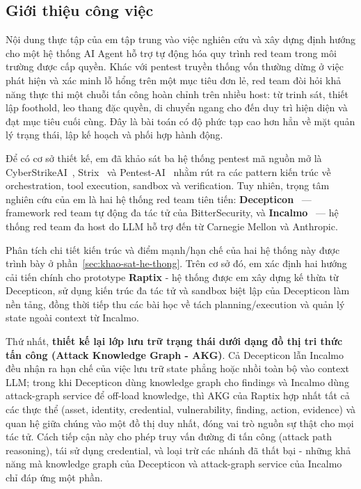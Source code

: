 \subsection{Giới thiệu công việc}
\label{sec:gioi-thieu-cong-viec}

Nội dung thực tập của em tập trung vào việc nghiên cứu và xây dựng định hướng cho một hệ thống AI Agent hỗ trợ tự động hóa quy trình red team trong môi trường được cấp quyền. Khác với pentest truyền thống vốn thường dừng ở việc phát hiện và xác minh lỗ hổng trên một mục tiêu đơn lẻ, red team đòi hỏi khả năng thực thi một chuỗi tấn công hoàn chỉnh trên nhiều host: từ trinh sát, thiết lập foothold, leo thang đặc quyền, di chuyển ngang cho đến duy trì hiện diện và đạt mục tiêu cuối cùng. Đây là bài toán có độ phức tạp cao hơn hẳn về mặt quản lý trạng thái, lập kế hoạch và phối hợp hành động.

Để có cơ sở thiết kế, em đã khảo sát ba hệ thống pentest mã nguồn mở là CyberStrikeAI~\cite{cyberstrike}, Strix~\cite{strix} và Pentest-AI~\cite{pentestai} nhằm rút ra các pattern kiến trúc về orchestration, tool execution, sandbox và verification. Tuy nhiên, trọng tâm nghiên cứu của em là hai hệ thống red team tiên tiến: \textbf{Decepticon}~\cite{decepticon} --- framework red team tự động đa tác tử của BitterSecurity, và \textbf{Incalmo}~\cite{incalmo} --- hệ thống red team đa host do LLM hỗ trợ đến từ Carnegie Mellon và Anthropic.

Phân tích chi tiết kiến trúc và điểm mạnh/hạn chế của hai hệ thống này được trình bày ở phần~\ref{sec:khao-sat-he-thong}. Trên cơ sở đó, em xác định hai hướng cải tiến chính cho prototype \textbf{Raptix} - hệ thống được em xây dựng kế thừa từ Decepticon, sử dụng kiến trúc đa tác tử và sandbox biệt lập của Decepticon làm nền tảng, đồng thời tiếp thu các bài học về tách planning/execution và quản lý state ngoài context từ Incalmo.

Thứ nhất, \textbf{thiết kế lại lớp lưu trữ trạng thái dưới dạng đồ thị tri thức tấn công (Attack Knowledge Graph - AKG)}. Cả Decepticon lẫn Incalmo đều nhận ra hạn chế của việc lưu trữ state phẳng hoặc nhồi toàn bộ vào context LLM; trong khi Decepticon dùng knowledge graph cho findings và Incalmo dùng attack-graph service để off-load knowledge, thì AKG của Raptix hợp nhất tất cả các thực thể (asset, identity, credential, vulnerability, finding, action, evidence) và quan hệ giữa chúng vào một đồ thị duy nhất, đóng vai trò nguồn sự thật cho mọi tác tử. Cách tiếp cận này cho phép truy vấn đường đi tấn công (attack path reasoning), tái sử dụng credential, và loại trừ các nhánh đã thất bại - những khả năng mà knowledge graph của Decepticon và attack-graph service của Incalmo chỉ đáp ứng một phần.


